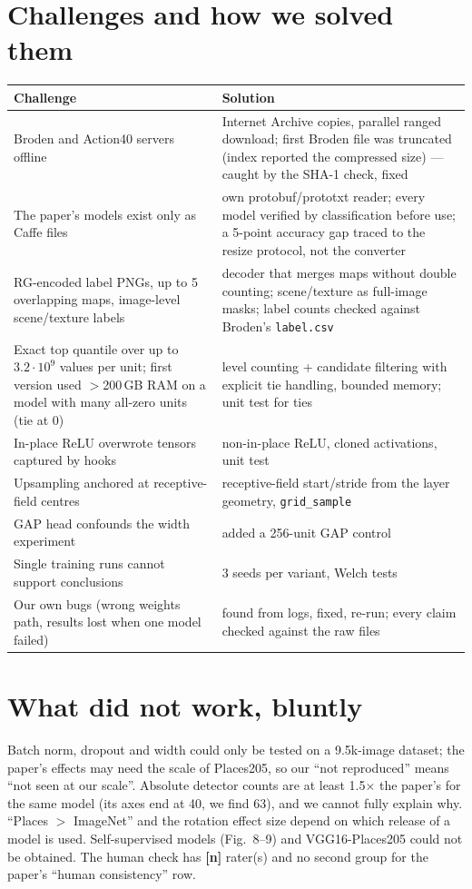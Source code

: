 \documentclass[10pt,a4paper]{article}
\newcommand{\fillin}[1]{\colorbox{yellow!40}{\textbf{[#1]}}}
\begin{document}
\section{Challenges and how we solved them}
\begin{tabularx}{\linewidth}{@{}>{\raggedright\arraybackslash}p{4.6cm}X@{}}\toprule
Challenge & Solution \\\midrule
Broden and Action40 servers offline & Internet Archive copies, parallel ranged download; first Broden file was truncated (index reported the compressed size) --- caught by the SHA-1 check, fixed \\
The paper's models exist only as Caffe files & own protobuf/prototxt reader; every model verified by classification before use; a 5-point accuracy gap traced to the resize protocol, not the converter \\
RG-encoded label PNGs, up to 5 overlapping maps, image-level scene/texture labels & decoder that merges maps without double counting; scene/texture as full-image masks; label counts checked against Broden's \texttt{label.csv} \\
Exact top quantile over up to $3.2\cdot10^9$ values per unit; first version used $>$200\,GB RAM on a model with many all-zero units (tie at 0) & level counting + candidate filtering with explicit tie handling, bounded memory; unit test for ties \\
In-place ReLU overwrote tensors captured by hooks & non-in-place ReLU, cloned activations, unit test \\
Upsampling anchored at receptive-field centres & receptive-field start/stride from the layer geometry, \texttt{grid\_sample} \\
GAP head confounds the width experiment & added a 256-unit GAP control \\
Single training runs cannot support conclusions & 3 seeds per variant, Welch tests \\
Our own bugs (wrong weights path, results lost when one model failed) & found from logs, fixed, re-run; every claim checked against the raw files \\\bottomrule
\end{tabularx}

\section{What did not work, bluntly}
Batch norm, dropout and width could only be tested on a 9.5k-image dataset; the paper's effects may need the scale of
Places205, so our ``not reproduced'' means ``not seen at our scale''. Absolute detector counts are at least 1.5$\times$ the
paper's for the same model (its axes end at 40, we find 63), and we cannot fully explain why. ``Places $>$ ImageNet'' and the rotation effect size depend on
which release of a model is used. Self-supervised models (Fig.~8--9) and VGG16-Places205 could not be obtained. The human
check has \fillin{n} rater(s) and no second group for the paper's ``human consistency'' row.
\end{document}
